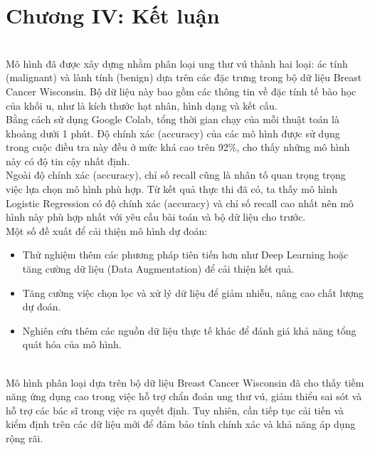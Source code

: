 \section{Chương IV: Kết luận}
\\ Mô hình đã được xây dựng nhằm phân loại ung thư vú thành hai loại: ác tính (malignant) và lành tính (benign) dựa trên các đặc trưng trong bộ dữ liệu Breast Cancer Wisconsin. Bộ dữ liệu này bao gồm các thông tin về đặc tính tế bào học của khối u, như là kích thước hạt nhân, hình dạng và kết cấu.
\\ Bằng cách sử dụng Google Colab, tổng thời gian chạy của mỗi thuật toán là khoảng dưới 1 phút. Độ chính xác (accuracy) của các mô hình được sử dụng trong cuộc điều tra này đều ở mức khá cao trên 92\%, cho thấy những mô hình này có độ tin cậy nhất định. 
\\ Ngoài độ chính xác (accuracy), chỉ số recall cũng là nhân tố quan trọng trọng việc lựa chọn mô hình phù hợp. Từ kết quả thực thi đã có, ta thấy mô hình Logistic Regression có độ chính xác (accuracy) và chỉ số recall cao nhất nên mô hình này phù hợp nhất với yêu cầu bài toán và bộ dữ liệu cho trước.  
\\Một số đề xuất để cải thiện mô hình dự đoán:
\begin{itemize}
    \item Thử nghiệm thêm các phương pháp tiên tiến hơn như Deep Learning hoặc tăng cường dữ liệu (Data Augmentation) để cải thiện kết quả.
    \item Tăng cường việc chọn lọc và xử lý dữ liệu để giảm nhiễu, nâng cao chất lượng dự đoán.
    \item Nghiên cứu thêm các nguồn dữ liệu thực tế khác để đánh giá khả năng tổng quát hóa của mô hình.
\end{itemize}
\\ Mô hình phân loại dựa trên bộ dữ liệu Breast Cancer Wisconsin đã cho thấy tiềm năng ứng dụng cao trong việc hỗ trợ chẩn đoán ung thư vú, giảm thiểu sai sót và hỗ trợ các bác sĩ trong việc ra quyết định. Tuy nhiên, cần tiếp tục cải tiến và kiểm định trên các dữ liệu mới để đảm bảo tính chính xác và khả năng áp dụng rộng rãi.

